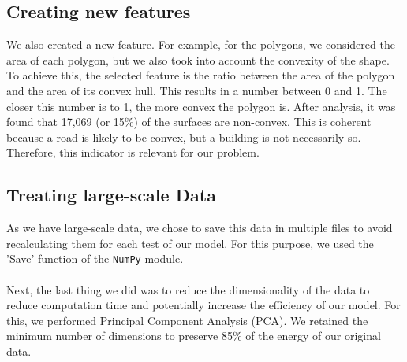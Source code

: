\subsection{Creating new features}

We also created a new feature. For example, for the polygons, we considered the area of each polygon, but we also took into account the convexity of the shape. To achieve this, the selected feature is the ratio between the area of the polygon and the area of its convex hull. This results in a number between 0 and 1. The closer this number is to 1, the more convex the polygon is. After analysis, it was found that 17,069 (or 15\%) of the surfaces are non-convex. This is coherent because a road is likely to be convex, but a building is not necessarily so. Therefore, this indicator is relevant for our problem.

\subsection{Treating large-scale Data}

As we have large-scale data, we chose to save this data in multiple files to avoid recalculating them for each test of our model. For this purpose, we used the 'Save' function of the \texttt{NumPy} module.\\ \\
Next, the last thing we did was to reduce the dimensionality of the data to reduce computation time and potentially increase the efficiency of our model. For this, we performed Principal Component Analysis (PCA). We retained the minimum number of dimensions to preserve 85\% of the energy of our original data.
